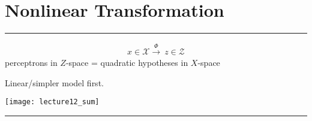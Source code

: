 \section{Nonlinear Transformation}
\noindent
{\color{LightRubineRed} \rule{\linewidth}{1mm} }
\begin{align*}
x \in \mathcal{X} \overset{\Phi}{\rightarrow} \ z \in \mathcal{Z}
\end{align*}
perceptrons in $Z$-space = quadratic hypotheses in $X$-space \par
Linear/simpler model first. \par
\begin{center}
\texttt{[image: lecture12\_sum]}\\
\end{center}
\noindent
{\color{RubineRed} \rule{\linewidth}{1mm} }